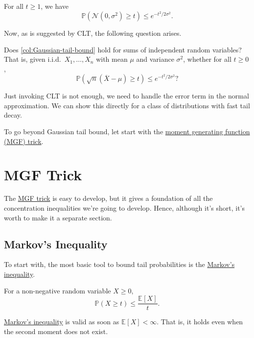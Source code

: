 \begin{corollary}\label{col:Gaussian-tail-bound}
  For all \(t \geq 1\), we have
  \[
    \mathbb{P} (\mathcal{N} (0, \sigma ^{2} ) \geq t) \leq e^{-t^2 / 2\sigma ^{2} }.
  \]
\end{corollary}

Now, as is suggested by CLT, the following question arises.

\begin{problem*}
  Does \autoref{col:Gaussian-tail-bound} hold for sums of independent random variables? That is, given i.i.d.\ \(X_1, \dots , X_n\) with mean \(\mu \) and variance \(\sigma ^{2} \), whether for all \(t \geq 0\),
  \[
    \mathbb{P} (\sqrt{n}(\overline{X} - \mu ) \geq t )\leq e^{-t^2 / 2 \sigma ^{2} }?
  \]
\end{problem*}
\begin{answer}
  Just invoking CLT is not enough, we need to handle the error term in the normal approximation. We can show this directly for a class of distributions with fast tail decay.
\end{answer}

To go beyond Gaussian tail bound, let start with the \hyperref[lma:MGF-trick]{moment generating function (MGF) trick}.

\section{MGF Trick}
The \hyperref[lma:MGF-trick]{MGF trick} is easy to develop, but it gives a foundation of all the concentration inequalities we're going to develop. Hence, although it's short, it's worth to make it a separate section.

\subsection{Markov's Inequality}
To start with, the most basic tool to bound tail probabilities is the \hyperref[lma:Markov-inequality]{Markov's inequality}.

\begin{lemma}\label{lma:Markov-inequality}
  For a non-negative random variable \(X \geq 0\),
  \[
    \mathbb{P} (X \geq t) \leq \frac{\mathbb{E}_{}\left[X \right] }{t}.
  \]
\end{lemma}

\begin{note}
  \hyperref[lma:Markov-inequality]{Markov's inequality} is valid as soon as \(\mathbb{E}_{}\left[X \right] < \infty \). That is, it holds even when the second moment does not exist.
\end{note}

